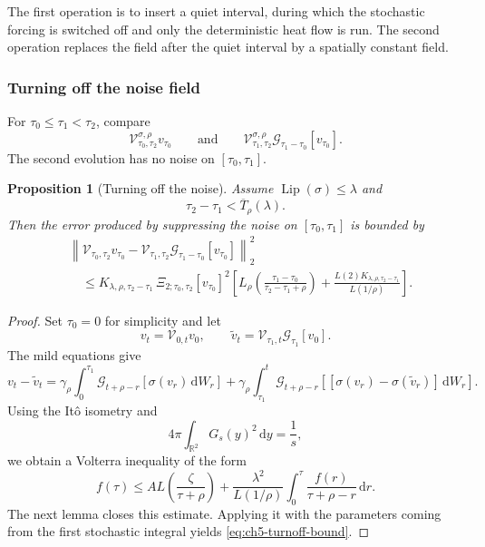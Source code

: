 \documentclass[11pt]{article}
\newtheorem{proposition}[theorem]{Proposition}
\theoremstyle{definition}
\theoremstyle{remark}
\newcommand{\R}{\mathbb{R}}
\newcommand{\Lip}{\operatorname{Lip}}
\newcommand{\dd}{\,\mathrm{d}}
\newcommand{\norm}[1]{\left\lVert #1\right\rVert}
\newcommand{\hsemig}[2]{\mathcal{G}_{#1}\left[{#2}\right]}
\newcommand{\V}{\mathcal{V}}
\newcommand{\Lrho}{L_{\rho}}
\begin{document}
The first operation is to insert a quiet interval, during which the stochastic forcing is switched off and only the deterministic heat flow is run. The second operation replaces the field after the quiet interval by a spatially constant field.

\subsubsection{Turning off the noise field}

For \(\tau_0\le \tau_1<\tau_2\), compare
\[
\V^{\sigma,\rho}_{\tau_0,\tau_2}v_{\tau_0}
\qquad\text{and}\qquad
\V^{\sigma,\rho}_{\tau_1,\tau_2}
\hsemig{\tau_1-\tau_0}{v_{\tau_0}}.
\]
The second evolution has no noise on \([\tau_0,\tau_1]\).

\begin{proposition}[Turning off the noise]\label{prop:ch5-turnoff}
Assume \(\Lip(\sigma)\le\lambda\) and
\[
\tau_2-\tau_1<\overline T_{\rho}(\lambda).
\]
Then the error produced by suppressing the noise on \([\tau_0,\tau_1]\) is bounded by
\begin{equation}\label{eq:ch5-turnoff-bound}
\begin{aligned}
&\norm{\V_{\tau_0,\tau_2}v_{\tau_0}
-\V_{\tau_1,\tau_2}\hsemig{\tau_1-\tau_0}{v_{\tau_0}}}_2^2
\\
&\quad\le
K_{\lambda,\rho,\tau_2-\tau_1}\,
\Xi_{2;\tau_0,\tau_2}[v_{\tau_0}]^2
\left[
\Lrho\!\left(\frac{\tau_1-\tau_0}{\tau_2-\tau_1+\rho}\right)
+\frac{L(2)K_{\lambda,\rho,\tau_2-\tau_1}}{L(1/\rho)}
\right].
\end{aligned}
\end{equation}
\end{proposition}

\begin{proof}
Set \(\tau_0=0\) for simplicity and let
\[
v_t=\V_{0,t}v_0,
\qquad
\widetilde v_t=\V_{\tau_1,t}\hsemig{\tau_1}{v_0}.
\]
The mild equations give
\[
 v_t-\widetilde v_t
 =\gamma_\rho\int_0^{\tau_1}
 \hsemig{t+\rho-r}{\sigma(v_r)\dd W_r}
 +\gamma_\rho\int_{\tau_1}^t
 \hsemig{t+\rho-r}{[\sigma(v_r)-\sigma(\widetilde v_r)]\dd W_r}.
\]
Using the It\^o isometry and
\[
4\pi\int_{\R^2}G_s(y)^2\dd y=\frac1s,
\]
we obtain a Volterra inequality of the form
\begin{equation}\label{eq:ch5-volterra1}
f(\tau)
\le A L\!\left(\frac{\zeta}{\tau+\rho}\right)
+\frac{\lambda^2}{L(1/\rho)}
\int_0^\tau\frac{f(r)}{\tau+\rho-r}\dd r.
\end{equation}
The next lemma closes this estimate. Applying it with the parameters coming from the first stochastic integral yields \eqref{eq:ch5-turnoff-bound}.
\end{proof}
\end{document}
